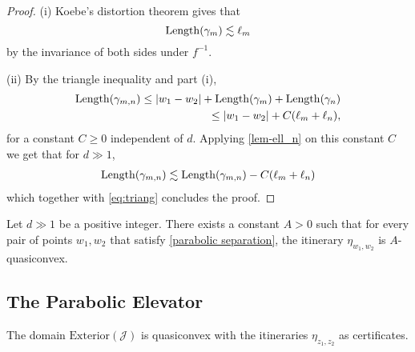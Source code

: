 \begin{proof}
(i) 	Koebe's distortion theorem gives that 
\begin{equation}
		\operatorname{Length}(\gamma_m) \lesssim \ell_m
	\end{equation}
	by the invariance of both sides under $f^{-1}$.

(ii) By the triangle inequality and part (i),
\begin{align} \label{eq:triang}
	\begin{split}
	\Length(\gamma_{m,n}) \leq |w_1-w_2|+\Length(\gamma_m)+\Length(\gamma_n) %
	\\ \leq |w_1-w_2|+C(\ell_m + \ell_n),
	\end{split}
\end{align}
for a constant $C \geq 0$ independent of $d$. Applying \cref{lem-ell_n} on this constant $C$ we get that for $d \gg 1$, 
\begin{align*}
\operatorname{Length}(\gamma_{m,n}) \lesssim \operatorname{Length}(\gamma_{m,n}) - C(\ell_m + \ell _n)
\end{align*}
which together with \eqref{eq:triang} concludes the proof.
\end{proof}

\begin{corollary}
	Let $d \gg 1$ be a positive integer. There exists a constant $A>0$ such that for every pair of points $w_1,w_2$ that satisfy \cref{parabolic separation}, the itinerary $\eta_{w_1,w_2}$ is $A$-quasiconvex.
\end{corollary}

\subsection{The Parabolic Elevator}

\begin{theorem} \label{quasiconvex-cauliflower} %
	\begin{enumerate}[label=\normalfont(\roman*)]
	The domain $\mathrm{Exterior}(\mathcal{J})$ is quasiconvex with the itineraries $\eta_{z_1,z_2}$ as certificates.
	\end{enumerate}
\end{theorem}


